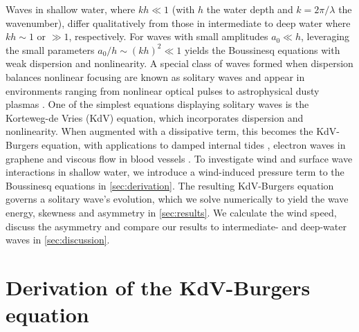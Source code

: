 \documentclass{jfm}
\begin{document}
Waves in shallow water, where $kh \ll 1$ (with $h$ the water depth and
$k=2\pi/\lambda$ the wavenumber), differ qualitatively from those in
intermediate to deep water where $kh \sim 1$ or $\gg 1$, respectively.
For waves with small amplitudes $a_0 \ll h$,
leveraging the small parameters $a_0/h \sim (kh)^2 \ll 1$
yields the Boussinesq equations with weak dispersion and nonlinearity.
A special class of waves formed when dispersion balances nonlinear
focusing are known as solitary waves and appear in environments ranging
from nonlinear optical pulses \citep[\eg][]{kivshar1993dark} to
astrophysical dusty plasmas \citep[\eg][]{sahu2012nonextensive}.
One of the simplest equations displaying solitary waves is the
Korteweg-de Vries (KdV) equation, which incorporates dispersion and
nonlinearity.
When augmented with a dissipative term, this becomes the KdV-Burgers
equation, with applications to damped internal tides
\citep[\eg][]{sandstrom1995dissipation}, electron waves in graphene
\citep[\eg][]{zdyrski2019effects} and viscous flow in blood vessels
\citep[\eg][]{antar1999weakly}.
To investigate wind and surface wave interactions in shallow water, we
introduce a wind-induced pressure term to the Boussinesq equations in
\cref{sec:derivation}.
The resulting KdV-Burgers equation governs a solitary wave's evolution,
which we solve numerically to yield the wave energy, skewness and
asymmetry in \cref{sec:results}.
We calculate the wind speed, discuss the asymmetry and
compare our results to intermediate- and deep-water waves in
\cref{sec:discussion}.

\vspace{-0.5cm}
\section{\label{sec:derivation} Derivation of the KdV-Burgers equation}
\end{document}
